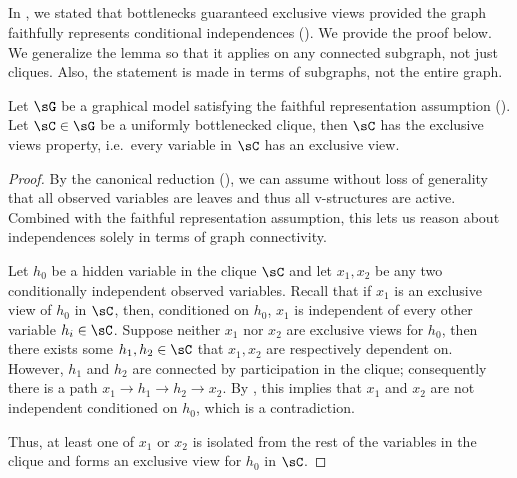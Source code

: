 \subsection{}
\label{app:exclusive-views}

In , we stated that bottlenecks guaranteed
exclusive views provided the graph faithfully represents conditional independences (). 
We provide the proof below.
  We generalize the lemma so that it applies
  on any connected subgraph, not just cliques.
  Also, the statement is made in terms of subgraphs,
  not the entire graph.

\begin{lemma*}
  Let $\sG$ be a graphical model satisfying the faithful representation assumption ().
  Let $\sC \in \sG$ be a uniformly bottlenecked clique, then
  $\sC$ has the exclusive views property, i.e.\ every variable in $\sC$
  has an exclusive view.
\end{lemma*}

\begin{proof}
By the canonical reduction (), we can assume without
  loss of generality that all observed variables are leaves and thus
  all v-structures are active.
Combined with the faithful representation assumption, this lets us
  reason about independences solely in terms of graph connectivity.

Let $h_0$ be a hidden variable in the clique $\sC$ and let $x_1, x_2$ be any
  two conditionally independent observed variables. 
Recall that if $x_1$ is an exclusive view of $h_0$ in $\sC$,
  then, conditioned on $h_0$, $x_1$ is independent of every other variable $h_i
  \in \sC$.
Suppose neither $x_1$ nor $x_2$ are exclusive views for $h_0$, 
  then there exists some $h_1, h_2 \in \sC$ that $x_1, x_2$ are respectively dependent on.
However, $h_1$ and $h_2$ are connected by participation in the clique; consequently there is a path $x_1 \to h_1 \to h_2 \to x_2$. 
By , this implies that $x_1$ and $x_2$ are not
  independent conditioned on $h_0$, which is a contradiction.

Thus, at least one of $x_1$ or $x_2$ is isolated from the rest of the
variables in the clique and forms an exclusive view for $h_0$ in $\sC$.

\end{proof}

